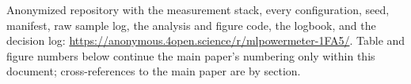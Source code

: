 \documentclass{article}
\begin{document}

\printAffiliationsAndNotice{}

Anonymized repository with the measurement stack, every configuration, seed, manifest, raw sample log, the analysis and figure code, the logbook, and the decision log: \url{https://anonymous.4open.science/r/mlpowermeter-1FA5/}. Table and figure numbers below continue the main paper's numbering only within this document; cross-references to the main paper are by section.


\end{document}
